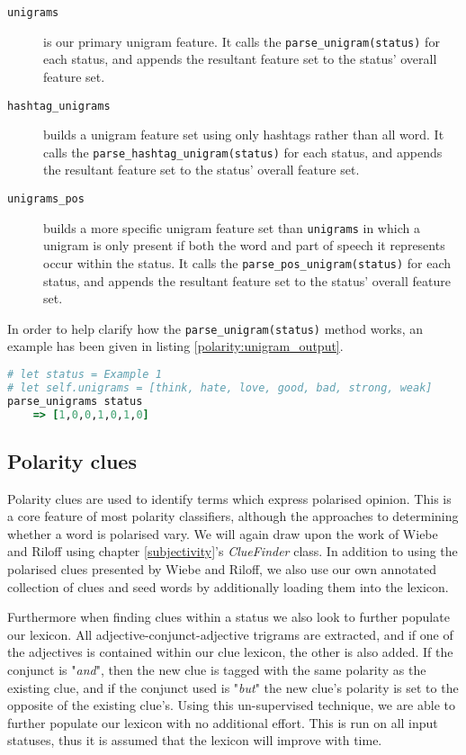 \begin{description}
	\item [\texttt{unigrams}] is our primary unigram feature. It calls the \texttt{parse\-\_unigram\-(status)} for each status, and appends the resultant feature set to the status' overall feature set.
	\item [\texttt{hashtag\_unigrams}] builds a unigram feature set using only hashtags rather than all word. It calls the \texttt{parse\-\_hashtag\-\_unigram\-(status)} for each status, and appends the resultant feature set to the status' overall feature set.
	\item [\texttt{unigrams\_pos}] builds a more specific unigram feature set than \texttt{unigrams} in which a unigram is only present if both the word and part of speech it represents occur within the status. It calls the \texttt{parse\-\_pos\-\_unigram\-(status)} for each status, and appends the resultant feature set to the status' overall feature set.
\end{description}

In order to help clarify how the \texttt{parse\-\_unigram\-(status)} method works, an example has been given in listing \ref{polarity:unigram_output}.

\begin{lstlisting}[language=Ruby, caption={Unigram parsing for \emph{Example 1} using a small unigram set}, label=polarity:unigram_output]
# let status = Example 1
# let self.unigrams = [think, hate, love, good, bad, strong, weak]
parse_unigrams status
	=> [1,0,0,1,0,1,0]
\end{lstlisting}

\subsection{Polarity clues}

Polarity clues are used to identify terms which express polarised opinion. This is a core feature of most polarity classifiers, although the approaches to determining whether a word is polarised vary. We will again draw upon the work of Wiebe and Riloff \cite{Wiebe:2003wa} using chapter \ref{subjectivity}'s \emph{ClueFinder} class. In addition to using the polarised clues presented by Wiebe and Riloff, we also use our own annotated collection of clues and seed words by additionally loading them into the lexicon.

Furthermore when finding clues within a status we also look to further populate our lexicon. All adjective-conjunct-adjective trigrams are extracted, and if one of the adjectives is contained within our clue lexicon, the other is also added. If the conjunct is "\emph{and}", then the new clue is tagged with the same polarity as the existing clue, and if the conjunct used is "\emph{but}" the new clue's polarity is set to the opposite of the existing clue's. Using this un-supervised technique, we are able to further populate our lexicon with no additional effort. This is run on all input statuses, thus it is assumed that the lexicon will improve with time. 


